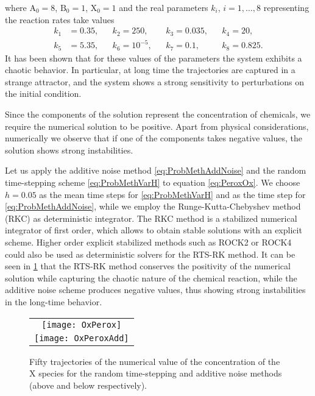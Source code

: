 \documentclass[final,onefignum,onetabnum]{siamonline171218}
\begin{document}
where $\mathrm{A}_0 = 8$, $\mathrm{B}_0 = 1$, $\mathrm{X}_0 = 1$ and the real parameters $k_i$, $i = 1, \ldots, 8$ representing the reaction rates take values
\begin{equation}
\begin{aligned}
k_1 &= 0.35, &&k_2 = 250, &&k_3 = 0.035, &&k_4 = 20,\\
k_5 &= 5.35, &&k_6 = 10^{-5}, &&k_7 = 0.1, &&k_8 = 0.825.
\end{aligned}
\end{equation}            
It has been shown \cite{Ols83} that for these values of the parameters the system exhibits a chaotic behavior. In particular, at long time the trajectories are captured in a strange attractor, and the system shows a strong sensitivity to perturbations on the initial condition. 

Since the components of the solution represent the concentration of chemicals, we require the numerical solution to be positive. Apart from physical considerations, numerically we observe that if one of the components takes negative values, the solution shows strong instabilities. 

Let us apply the additive noise method \eqref{eq:ProbMethAddNoise} and the random time-stepping scheme \eqref{eq:ProbMethVarH} to equation \eqref{eq:PeroxOx}. We choose $h = 0.05$ as the mean time steps for \eqref{eq:ProbMethVarH} and as the time step for \eqref{eq:ProbMethAddNoise}, while we employ the Runge-Kutta-Chebyshev method (RKC) \cite{HoS80} as deterministic integrator. The RKC method is a stabilized numerical integrator of first order, which allows to obtain stable solutions with an explicit scheme. Higher order explicit stabilized methods such as ROCK2 or ROCK4 \cite{AbM01, Abd02} could also be used as deterministic solvers for the RTS-RK method. It can be seen in \cref{fig:OxPeroxTraj} that the RTS-RK method conserves the positivity of the numerical solution while capturing the chaotic nature of the chemical reaction, while the additive noise scheme produces negative values, thus showing strong instabilities in the long-time behavior.
\begin{figure}
	\begin{center} 
		\begin{tabular}{c}
			\texttt{[image: OxPerox]}\\
			\texttt{[image: OxPeroxAdd]}
		\end{tabular}
	\end{center}
	\caption{Fifty trajectories of the numerical value of the concentration of the $\mathrm X$ species for the random time-stepping and additive noise methods (above and below respectively).}
	\label{fig:OxPeroxTraj}
\end{figure}
\end{document}

